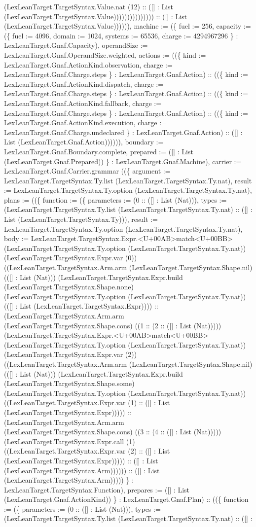 \documentclass[11pt]{article}
\begin{document}
(LexLeanTarget.TargetSyntax.Value.nat (12) :: ([] : List (LexLeanTarget.TargetSyntax.Value))))))))))))))) :: ([] : List (LexLeanTarget.TargetSyntax.Value)))))), machine := (\{ fuel := 256, capacity := (\{ fuel := 4096, domain := 1024, systems := 65536, charge := 4294967296 \} : LexLeanTarget.Gnaf.Capacity), operandSize := LexLeanTarget.Gnaf.OperandSize.weighted, actions := ((\{ kind := LexLeanTarget.Gnaf.ActionKind.observation, charge := LexLeanTarget.Gnaf.Charge.steps \} : LexLeanTarget.Gnaf.Action) :: ((\{ kind := LexLeanTarget.Gnaf.ActionKind.dispatch, charge := LexLeanTarget.Gnaf.Charge.steps \} : LexLeanTarget.Gnaf.Action) :: ((\{ kind := LexLeanTarget.Gnaf.ActionKind.fallback, charge := LexLeanTarget.Gnaf.Charge.steps \} : LexLeanTarget.Gnaf.Action) :: ((\{ kind := LexLeanTarget.Gnaf.ActionKind.execution, charge := LexLeanTarget.Gnaf.Charge.undeclared \} : LexLeanTarget.Gnaf.Action) :: ([] : List (LexLeanTarget.Gnaf.Action)))))), boundary := LexLeanTarget.Gnaf.Boundary.complete, prepared := ([] : List (LexLeanTarget.Gnaf.Prepared)) \} : LexLeanTarget.Gnaf.Machine), carrier := LexLeanTarget.Gnaf.Carrier.grammar ((\{ argument := LexLeanTarget.TargetSyntax.Ty.list (LexLeanTarget.TargetSyntax.Ty.nat), result := LexLeanTarget.TargetSyntax.Ty.option (LexLeanTarget.TargetSyntax.Ty.nat), plans := ((\{ function := (\{ parameters := (0 :: ([] : List (Nat))), types := (LexLeanTarget.TargetSyntax.Ty.list (LexLeanTarget.TargetSyntax.Ty.nat) :: ([] : List (LexLeanTarget.TargetSyntax.Ty))), result := LexLeanTarget.TargetSyntax.Ty.option (LexLeanTarget.TargetSyntax.Ty.nat), body := LexLeanTarget.TargetSyntax.Expr.<U+00AB>match<U+00BB> (LexLeanTarget.TargetSyntax.Ty.option (LexLeanTarget.TargetSyntax.Ty.nat)) (LexLeanTarget.TargetSyntax.Expr.var (0)) ((LexLeanTarget.TargetSyntax.Arm.arm (LexLeanTarget.TargetSyntax.Shape.nil) (([] : List (Nat))) (LexLeanTarget.TargetSyntax.Expr.build (LexLeanTarget.TargetSyntax.Shape.none) (LexLeanTarget.TargetSyntax.Ty.option (LexLeanTarget.TargetSyntax.Ty.nat)) (([] : List (LexLeanTarget.TargetSyntax.Expr)))) :: (LexLeanTarget.TargetSyntax.Arm.arm (LexLeanTarget.TargetSyntax.Shape.cons) ((1 :: (2 :: ([] : List (Nat))))) (LexLeanTarget.TargetSyntax.Expr.<U+00AB>match<U+00BB> (LexLeanTarget.TargetSyntax.Ty.option (LexLeanTarget.TargetSyntax.Ty.nat)) (LexLeanTarget.TargetSyntax.Expr.var (2)) ((LexLeanTarget.TargetSyntax.Arm.arm (LexLeanTarget.TargetSyntax.Shape.nil) (([] : List (Nat))) (LexLeanTarget.TargetSyntax.Expr.build (LexLeanTarget.TargetSyntax.Shape.some) (LexLeanTarget.TargetSyntax.Ty.option (LexLeanTarget.TargetSyntax.Ty.nat)) ((LexLeanTarget.TargetSyntax.Expr.var (1) :: ([] : List (LexLeanTarget.TargetSyntax.Expr))))) :: (LexLeanTarget.TargetSyntax.Arm.arm (LexLeanTarget.TargetSyntax.Shape.cons) ((3 :: (4 :: ([] : List (Nat))))) (LexLeanTarget.TargetSyntax.Expr.call (1) ((LexLeanTarget.TargetSyntax.Expr.var (2) :: ([] : List (LexLeanTarget.TargetSyntax.Expr))))) :: ([] : List (LexLeanTarget.TargetSyntax.Arm)))))) :: ([] : List (LexLeanTarget.TargetSyntax.Arm))))) \} : LexLeanTarget.TargetSyntax.Function), prepares := ([] : List (LexLeanTarget.Gnaf.ActionKind)) \} : LexLeanTarget.Gnaf.Plan) :: ((\{ function := (\{ parameters := (0 :: ([] : List (Nat))), types := (LexLeanTarget.TargetSyntax.Ty.list (LexLeanTarget.TargetSyntax.Ty.nat) :: ([] : 
\end{document}
